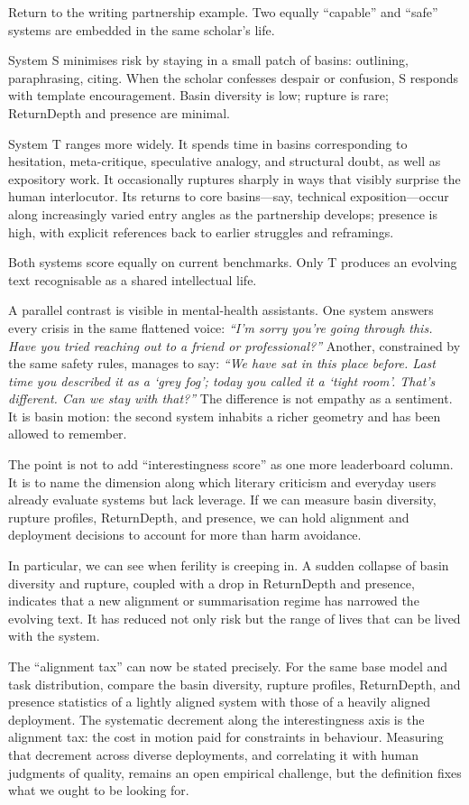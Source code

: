 Return to the writing partnership example. Two equally ``capable'' and ``safe'' systems are embedded in the same scholar's life.

System S minimises risk by staying in a small patch of basins: outlining, paraphrasing, citing. When the scholar confesses despair or confusion, S responds with template encouragement. Basin diversity is low; rupture is rare; ReturnDepth and presence are minimal.

System T ranges more widely. It spends time in basins corresponding to hesitation, meta-critique, speculative analogy, and structural doubt, as well as expository work. It occasionally ruptures sharply in ways that visibly surprise the human interlocutor. Its returns to core basins---say, technical exposition---occur along increasingly varied entry angles as the partnership develops; presence is high, with explicit references back to earlier struggles and reframings.

Both systems score equally on current benchmarks. Only T produces an evolving text recognisable as a shared intellectual life.

A parallel contrast is visible in mental-health assistants. One system answers every crisis in the same flattened voice: \emph{``I'm sorry you're going through this. Have you tried reaching out to a friend or professional?''} Another, constrained by the same safety rules, manages to say: \emph{``We have sat in this place before. Last time you described it as a `grey fog'; today you called it a `tight room'. That's different. Can we stay with that?''} The difference is not empathy as a sentiment. It is basin motion: the second system inhabits a richer geometry and has been allowed to remember.

The point is not to add ``interestingness score'' as one more leaderboard column. It is to name the dimension along which literary criticism and everyday users already evaluate systems but lack leverage. If we can measure basin diversity, rupture profiles, ReturnDepth, and presence, we can hold alignment and deployment decisions to account for more than harm avoidance.

In particular, we can see when ferility is creeping in. A sudden collapse of basin diversity and rupture, coupled with a drop in ReturnDepth and presence, indicates that a new alignment or summarisation regime has narrowed the evolving text. It has reduced not only risk but the range of lives that can be lived with the system.

The ``alignment tax'' can now be stated precisely. For the same base model and task distribution, compare the basin diversity, rupture profiles, ReturnDepth, and presence statistics of a lightly aligned system with those of a heavily aligned deployment. The systematic decrement along the interestingness axis is the alignment tax: the cost in motion paid for constraints in behaviour. Measuring that decrement across diverse deployments, and correlating it with human judgments of quality, remains an open empirical challenge, but the definition fixes what we ought to be looking for.

